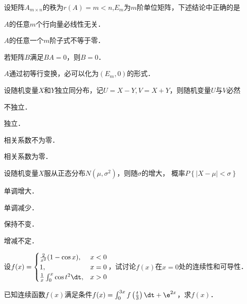 \documentclass[plain,noanswer,medmath]{../../template/jnuexam}
\begin{document}
\begin{problem}
设矩阵$A_{m \times n}$的秩为$r(A) = m < n$,$E_m$为$m$阶单位矩阵，下述结论中正确的是\pickout{}
\begin{abcd}
\item $A$的任意$m$个行向量必线性无关．
\item $A$的任意一个$m$阶子式不等于零．
\item 若矩阵$B$满足$BA = 0$，则$B = 0$．
\item $A$通过初等行变换，必可以化为$(E_m,0)$的形式．
\end{abcd}
\end{problem}


\begin{problem}
设随机变量$X$和$Y$独立同分布，记$U = X - Y,V = X + Y$，则随机变量$U$与$V$必然\pickout{}
\begin{abcd}
\item 不独立．  
\item 独立．  
\item 相关系数不为零．  
\item 相关系数为零．
\end{abcd}
\end{problem}


\begin{problem}
设随机变量$X$服从正态分布$N(\mu,\sigma^2)$，则随$\sigma$的增大，
概率$P\left\{\left| X - \mu \right| < \sigma \right\}$\pickout{}
\begin{abcd}
\item 单调增大．   
\item 单调减少．   
\item 保持不变．   
\item 增减不定．
\end{abcd}
\end{problem}



\begin{problem}
设$f(x) = \begin{cases}
          \frac{2}{x^2}(1 - \cos x), & x < 0 \\
                                  1, & x = 0 \\
  \frac{1}{x}\int_0^x \cos t^2 \dt , & x > 0
\end{cases}$，试讨论$f(x)$在$x = 0$处的连续性和可导性．
\end{problem}



\begin{problem}
已知连续函数$f(x)$满足条件$f(x) = \int_0^{3x} f\left(\frac{t}{3} \right) \dt + \e^{2x}$，求$f(x)$．
\end{problem}
\end{document}
